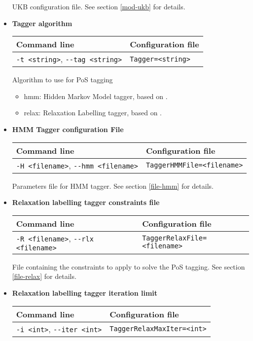 \documentclass[a4paper]{book}
\begin{document}
\begin{itemize}
  UKB configuration file.
  See section \ref{mod-ukb} for details.

\item {\bf Tagger algorithm}

\begin{tabular}{|l|l|}
Command line       & Configuration file   \\ \hline
\verb#-t <string>#, \verb#--tag <string>#   & \verb#Tagger=<string>#  \\ \hline
\end{tabular}

   Algorithm to use for PoS tagging
 \begin{itemize}
  \item hmm:  Hidden Markov Model tagger, based on \cite{brants00}.
  \item relax: Relaxation Labelling tagger, based on \cite{padro98a}.
 \end{itemize}

\item {\bf HMM Tagger configuration File}

\begin{tabular}{|l|l|}
Command line       & Configuration file   \\ \hline
\verb#-H <filename>#, \verb#--hmm <filename>#   & \verb#TaggerHMMFile=<filename>#  \\ \hline
\end{tabular}

  Parameters file for HMM tagger. 
  See section \ref{file-hmm} for details.

\item {\bf Relaxation labelling tagger constraints file}

\begin{tabular}{|l|l|}
Command line       & Configuration file   \\ \hline
\verb#-R <filename>#, \verb#--rlx <filename>#    & \verb#TaggerRelaxFile=<filename>#  \\ \hline
\end{tabular}

   File containing the constraints to apply to solve the PoS tagging.
   See section \ref{file-relax} for details.

\item {\bf Relaxation labelling tagger iteration limit}

\begin{tabular}{|l|l|}
Command line       & Configuration file   \\ \hline
\verb#-i <int>#, \verb#--iter <int>#   & \verb#TaggerRelaxMaxIter=<int>#  \\ \hline
\end{tabular}


\end{itemize}
\end{document}
